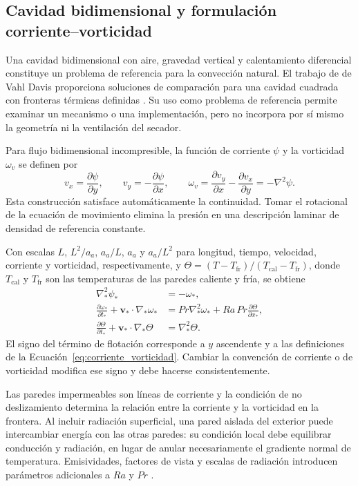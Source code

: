 \subsection{Cavidad bidimensional y formulación corriente--vorticidad}
\label{subsec:cavidad_2d}

Una cavidad bidimensional con aire, gravedad vertical y calentamiento diferencial constituye un problema de referencia para la convección natural. El trabajo de de Vahl Davis proporciona soluciones de comparación para una cavidad cuadrada con fronteras térmicas definidas \cite{devahl1983}. Su uso como problema de referencia permite examinar un mecanismo o una implementación, pero no incorpora por sí mismo la geometría ni la ventilación del secador.

Para flujo bidimensional incompresible, la función de corriente $\psi$ y la vorticidad $\omega_v$ se definen por
\begin{equation}
v_x=\frac{\partial\psi}{\partial y},
\qquad
v_y=-\frac{\partial\psi}{\partial x},
\qquad
\omega_v=\frac{\partial v_y}{\partial x}-\frac{\partial v_x}{\partial y}
=-\nabla^2\psi.
\label{eq:corriente_vorticidad}
\end{equation}
Esta construcción satisface automáticamente la continuidad. Tomar el rotacional de la ecuación de movimiento elimina la presión en una descripción laminar de densidad de referencia constante.

Con escalas $L$, $L^2/a_a$, $a_a/L$, $a_a$ y $a_a/L^2$ para longitud, tiempo, velocidad, corriente y vorticidad, respectivamente, y
$\Theta=(T-T_{\mathrm{fr}})/(T_{\mathrm{cal}}-T_{\mathrm{fr}})$, donde $T_{\mathrm{cal}}$ y $T_{\mathrm{fr}}$ son las temperaturas de las paredes caliente y fría, se obtiene
\begin{align}
\nabla_*^2\psi_*&=-\omega_*,\label{eq:poisson_corriente}\\
\frac{\partial\omega_*}{\partial t_*}
+\mathbf v_*\cdot\nabla_*\omega_*
&=Pr\nabla_*^2\omega_*+Ra\,Pr\frac{\partial\Theta}{\partial x_*},
\label{eq:vorticidad_adimensional}\\
\frac{\partial\Theta}{\partial t_*}
+\mathbf v_*\cdot\nabla_*\Theta
&=\nabla_*^2\Theta.
\label{eq:energia_cavidad}
\end{align}
El signo del término de flotación corresponde a $y$ ascendente y a las definiciones de la Ecuación~\eqref{eq:corriente_vorticidad}. Cambiar la convención de corriente o de vorticidad modifica ese signo y debe hacerse consistentemente.

Las paredes impermeables son líneas de corriente y la condición de no deslizamiento determina la relación entre la corriente y la vorticidad en la frontera. Al incluir radiación superficial, una pared aislada del exterior puede intercambiar energía con las otras paredes: su condición local debe equilibrar conducción y radiación, en lugar de anular necesariamente el gradiente normal de temperatura. Emisividades, factores de vista y escalas de radiación introducen parámetros adicionales a $Ra$ y $Pr$ \cite{balaji1993}.

